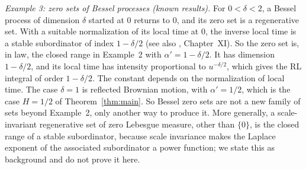 \documentclass[11pt]{article}
\theoremstyle{remark}
\theoremstyle{definition}
\begin{document}
\emph{Example 3: zero sets of Bessel processes (known results).} For $0<\delta<2$, a Bessel process of dimension $\delta$ started at $0$ returns to $0$, and its zero set is a regenerative set. With a suitable normalization of its local time at $0$, the inverse local time is a stable subordinator of index $1-\delta/2$ \cite{MO69} (see also \cite{RY99}, Chapter~XI). So the zero set is, in law, the closed range in Example~2 with $\alpha'=1-\delta/2$. It has dimension $1-\delta/2$, and its local time has intensity proportional to $u^{-\delta/2}$, which gives the RL integral of order $1-\delta/2$. The constant depends on the normalization of local time. The case $\delta=1$ is reflected Brownian motion, with $\alpha'=1/2$, which is the case $H=1/2$ of Theorem~\ref{thm:main}. So Bessel zero sets are not a new family of sets beyond Example~2, only another way to produce it. More generally, a scale-invariant regenerative set of zero Lebesgue measure, other than $\{0\}$, is the closed range of a stable subordinator, because scale invariance makes the Laplace exponent of the associated subordinator a power function; we state this as background and do not prove it here.
\end{document}
